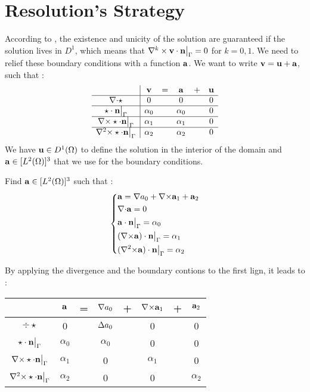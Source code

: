 \chapter{Resolution's Strategy}
\label{strategy}
According to \cite{Penel2004}, the existence and unicity of the solution are guaranteed if the solution lives in $D^1$, which means that $\nabla^k\times{\mathbf{v}}\cdot{\mathbf{n}}{\big\rvert_{\Gamma}}=0$ for $k=0,1$. We need to relief these boundary conditions with a function ${\mathbf{a}}$. We want to write ${\mathbf{v}}={\mathbf{u}}+{\mathbf{a}}$, such that :\\
\begin{equation}\label{v}
\begin{array}{c|ccccc}
& {\mathbf{v}} & = & {\mathbf{a}} & + & {\mathbf{u}}\\ \hline
{\nabla\cdot}\star & 0 & & 0 & & 0\\ \hline
\star\cdot {\mathbf{n}}{\big\rvert_{\Gamma}} & \alpha_0 & & \alpha_0 & & 0\\ \hline
{\nabla\times}\star\cdot {\mathbf{n}}{\big\rvert_{\Gamma}} & \alpha_1 & & \alpha_1 & & 0\\ \hline
{\nabla^2\times}\star\cdot {\mathbf{n}}{\big\rvert_{\Gamma}} & \alpha_2 & & \alpha_2 & & 0
\end{array}
\end{equation}
We have ${\mathbf{u}}\in D^1(\Omega)$ to define the solution in the interior of the domain and ${\mathbf{a}}\in [L^2(\Omega)]^3$ that we use for the boundary conditions.
\begin{pb}\label{a}
Find ${\mathbf{a}}\in [L^2(\Omega)]^3$ such that :
\begin{equation*}
\left\{\begin{aligned}
&{\mathbf{a}}={\nabla} a_0 + {\nabla\times}{\mathbf{a}}_1 + {\mathbf{a}}_2\\
&{\nabla\cdot} {\mathbf{a}} =0\\
&{\mathbf{a}}\cdot {\mathbf{n}}{\big\rvert_{\Gamma}} = \alpha_0\\
&({\nabla\times} {\mathbf{a}})\cdot {\mathbf{n}}{\big\rvert_{\Gamma}} = \alpha_1\\
&({\nabla^2\times}{\mathbf{a}})\cdot{\mathbf{n}}{\big\rvert_{\Gamma}} = \alpha_2
\end{aligned}\right.
\end{equation*}
\end{pb}
By applying the divergence and the boundary contions to the first lign, it leads to :
\begin{center}
\begin{tabular}{c|ccccccc}
& ${\mathbf{a}}$ & = & ${\nabla} a_0$ & + & ${\nabla\times} {\mathbf{a}}_1$ & + & ${\mathbf{a}}_2$ \\ \hline
$\div\star$ & 0 & & ${\Delta} a_0$ & & 0 & & 0\\ \hline
$\star\cdot {\mathbf{n}}{\big\rvert_{\Gamma}}$ & $\alpha_0$ & & $\alpha_0$ & & 0 & & 0\\ \hline
  ${\nabla\times}\star\cdot {\mathbf{n}}{\big\rvert_{\Gamma}}$ & $\alpha_1$ & & 0 & & $\alpha_1$ & & 0\\ \hline
  ${\nabla^2\times}\star\cdot{\mathbf{n}}{\big\rvert_{\Gamma}}$ & $\alpha_2$ & & 0 & & 0 & & $\alpha_2$
\end{tabular}
\end{center}

